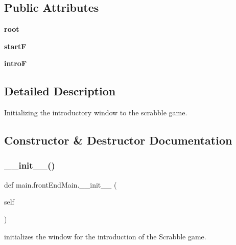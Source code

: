 \subsection*{Public Attributes}
\begin{DoxyCompactItemize}
\item 
\mbox{\label{classmain_1_1front_end_main_af53bbebe33868886ddc6e2cf3dda1219}} 
{\bfseries root}
\item 
\mbox{\label{classmain_1_1front_end_main_a22bf1b90bee0288ba262f4e55f270c7a}} 
{\bfseries startF}
\item 
\mbox{\label{classmain_1_1front_end_main_a52b65a0db838ce48147dd707cd38650d}} 
{\bfseries introF}
\end{DoxyCompactItemize}


\subsection{Detailed Description}
Initializing the introductory window to the scrabble game. 



\subsection{Constructor \& Destructor Documentation}
\mbox{\label{classmain_1_1front_end_main_ad177eca502ff731e6eb759018f5bd9a2}} 
\subsubsection{\texorpdfstring{\+\_\+\+\_\+init\+\_\+\+\_\+()}{\_\_init\_\_()}}
{\footnotesize\ttfamily def main.\+front\+End\+Main.\+\_\+\+\_\+init\+\_\+\+\_\+ (\begin{DoxyParamCaption}\item[{}]{self }\end{DoxyParamCaption})}



initializes the window for the introduction of the Scrabble game. 



